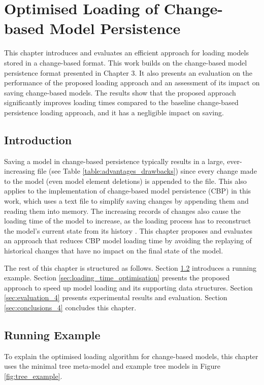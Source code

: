\chapter{Optimised Loading of Change-based Model Persistence}
\label{ch:optimised_loading}

This chapter introduces and evaluates an efficient approach for loading models stored in a change-based format. This work builds on the change-based model persistence format presented in Chapter 3. It also presents an evaluation on the performance of the proposed loading approach and an assessment of its impact on saving change-based models. The results show that the proposed approach significantly improves loading times compared to the baseline change-based persistence loading approach, and it has a negligible impact on saving.

\section{Introduction}
\label{sec:introduction_4}
Saving a model in change-based persistence typically results in a large, ever-increasing file (see Table \ref{table:advantages_drawbacks}) since every change made to the model (even model element deletions) is appended to the file. This also applies to the implementation of change-based model persistence (CBP) in this work, which uses a text file to simplify saving changes by appending them and reading them into memory. The increasing records of changes also cause the loading time of the model to increase, as the loading process has to reconstruct the model’s current state from its history \cite{DBLP:conf/models/YohannisKP17}. This chapter proposes and evaluates an approach that reduces CBP model loading time by avoiding the replaying of historical changes that have no impact on the final state of the model.

The rest of this chapter is structured as follows. Section \ref{sec:case_study} introduces a running example.
Section \ref{sec:loading_time_optimisation} presents the proposed approach to speed up model loading and its supporting data structures. Section \ref{sec:evaluation_4} presents experimental results and evaluation. Section \ref{sec:conclusions_4} concludes this chapter.

\section{Running Example}
\label{sec:case_study}
To explain the optimised loading algorithm for change-based models, this chapter uses the minimal tree meta-model and example tree models in Figure \ref{fig:tree_example}.

